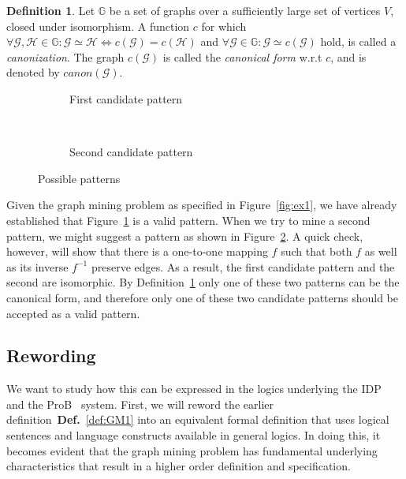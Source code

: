 \documentclass{article}
\theoremstyle{definition}
\newtheorem{definition}{Definition}[section]
\newcommand{\graph}[1]{\ensuremath{\mathcal{#1}}}
\newcommand{\graphset}[1]{\ensuremath{\mathbb{#1}}}
\begin{document}
\begin{definition}
\label{def:canonicalForm}
Let $\graphset{G}$ be a set of graphs over a sufficiently large set of vertices $V$, closed under isomorphism.
A function $c$ for which $\forall \graph{G,H} \in \graphset{G} : \graph{G} \simeq \graph{H} \iff c(\graph{G}) = c(\graph{H})$ and $\forall \graph{G} \in \graphset{G} : \graph{G} \simeq c(\graph{G})$ hold, is called a \emph{canonization}.
The graph $c(\graph{G})$ is called the \emph{canonical form} w.r.t $c$, and is denoted by $\mathit{canon}(\graph{G})$.
\end{definition}

\begin{figure}[h]
  \centering
  \begin{subfigure}[b]{0.45\textwidth}
    \centering
    \caption{First candidate pattern\label{fig:iso1}}
  \end{subfigure}
  ~
  \begin{subfigure}[b]{0.45\textwidth}
    \centering
    \caption{Second candidate pattern\label{fig:iso2}}
  \end{subfigure}
  \caption{Possible patterns\label{fig:isomorphism}}
\end{figure}

Given the graph mining problem as specified in Figure~\ref{fig:ex1}, we have already established that Figure~\ref{fig:iso1} is a valid pattern.
When we try to mine a second pattern, we might suggest a pattern as shown in Figure~\ref{fig:iso2}.
A quick check, however, will show that there is a one-to-one mapping $f$ such that both $f$ as well as its inverse $f^{-1}$ preserve edges.
As a result, the first candidate pattern and the second are isomorphic.
By Definition~\ref{def:canonicalForm} only one of these two patterns can be the canonical form, and therefore only one of these two candidate patterns should be accepted as a valid pattern.

\subsection{Rewording}
We want to study how this can be expressed in the logics underlying the IDP~\cite{} and the ProB~\cite{} system.
First, we will reword the earlier definition~\textbf{Def.}~\ref{def:GM1} into an equivalent formal definition that uses logical sentences and language constructs available in general logics.
In doing this, it becomes evident that the graph mining problem has fundamental underlying characteristics that result in a higher order definition and specification.
\end{document}
